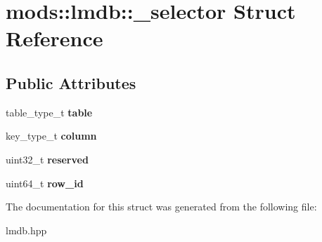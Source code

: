 \hypertarget{structmods_1_1lmdb_1_1__selector}{}\section{mods\+:\+:lmdb\+:\+:\+\_\+selector Struct Reference}
\label{structmods_1_1lmdb_1_1__selector}
\subsection*{Public Attributes}
\begin{DoxyCompactItemize}
\item 
\mbox{\label{structmods_1_1lmdb_1_1__selector_adc1d2bffbd1b17f09eb2ceb2b50d43c1}} 
table\+\_\+type\+\_\+t {\bfseries table}
\item 
\mbox{\label{structmods_1_1lmdb_1_1__selector_a20c2848360c3f7ad72dc541294fcdcf7}} 
key\+\_\+type\+\_\+t {\bfseries column}
\item 
\mbox{\label{structmods_1_1lmdb_1_1__selector_ac0d46417cc062d18bcb2402a5909752e}} 
uint32\+\_\+t {\bfseries reserved}
\item 
\mbox{\label{structmods_1_1lmdb_1_1__selector_a5f1037fd1a10de7cbf78060faef20c14}} 
uint64\+\_\+t {\bfseries row\+\_\+id}
\end{DoxyCompactItemize}


The documentation for this struct was generated from the following file\+:\begin{DoxyCompactItemize}
\item 
lmdb.\+hpp\end{DoxyCompactItemize}
